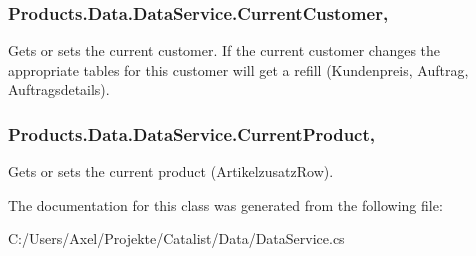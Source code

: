 \subsubsection[{\texorpdfstring{Current\+Customer}{CurrentCustomer}}]{ Products.\+Data.\+Data\+Service.\+Current\+Customer\hspace{0.3cm}{\ttfamily [get]}, {\ttfamily [set]}}\hypertarget{class_products_1_1_data_1_1_data_service_a764a7132feb14fdcf717ce22fa02f0aa}{}\label{class_products_1_1_data_1_1_data_service_a764a7132feb14fdcf717ce22fa02f0aa}


Gets or sets the current customer. If the current customer changes the appropriate tables for this customer will get a refill (Kundenpreis, Auftrag, Auftragsdetails). 

\subsubsection[{\texorpdfstring{Current\+Product}{CurrentProduct}}]{ Products.\+Data.\+Data\+Service.\+Current\+Product\hspace{0.3cm}{\ttfamily [get]}, {\ttfamily [set]}}\hypertarget{class_products_1_1_data_1_1_data_service_a528143e960156cad762a7c2e68231685}{}\label{class_products_1_1_data_1_1_data_service_a528143e960156cad762a7c2e68231685}


Gets or sets the current product (Artikelzusatz\+Row). 



The documentation for this class was generated from the following file\+:\begin{DoxyCompactItemize}
\item 
C\+:/\+Users/\+Axel/\+Projekte/\+Catalist/\+Data/Data\+Service.\+cs\end{DoxyCompactItemize}
